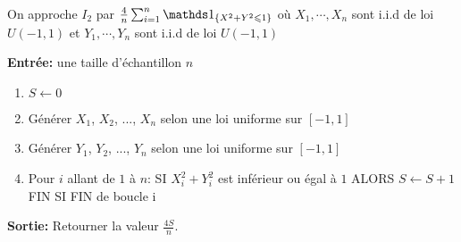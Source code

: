 \documentclass[11pt]{td_um}
\begin{document}
\begin{exo}{}
\begin{enumerate}
{                On approche $I_2$ par $\frac{4}{n} \sum_{i=1}^n \one_{ \{X^2+Y^2\leq 1\}}$ où  $X_1, \cdots, X_n$ sont i.i.d de loi $U(-1,1)$ et  $Y_1, \cdots, Y_n$ sont i.i.d de loi $U(-1,1)$

                \begin{algorithm}[H]
                    \SetAlgoLined
                    \textbf{Entrée:} une taille d'échantillon $n$

                    \begin{enumerate}
                        \item  $S\leftarrow 0$
                        \item  Générer $X_1$, $X_2$, ..., $X_n$ selon une loi uniforme sur $[-1,1]$
                        \item  Générer $Y_1$, $Y_2$, ..., $Y_n$ selon une loi uniforme sur $[-1,1]$
                        \item  Pour $i$ allant de $1$ à $n$:
                            SI $X_i^2+Y_i^2$ est inférieur ou égal à $1$ ALORS $S \leftarrow S+1$
                            FIN SI
                            FIN de boucle i
                    \end{enumerate}
                    \textbf{Sortie:} Retourner la valeur $\tfrac{4S}{n}$.            
                \end{algorithm}
            }
    \end{enumerate}
\end{exo}
\end{document}
